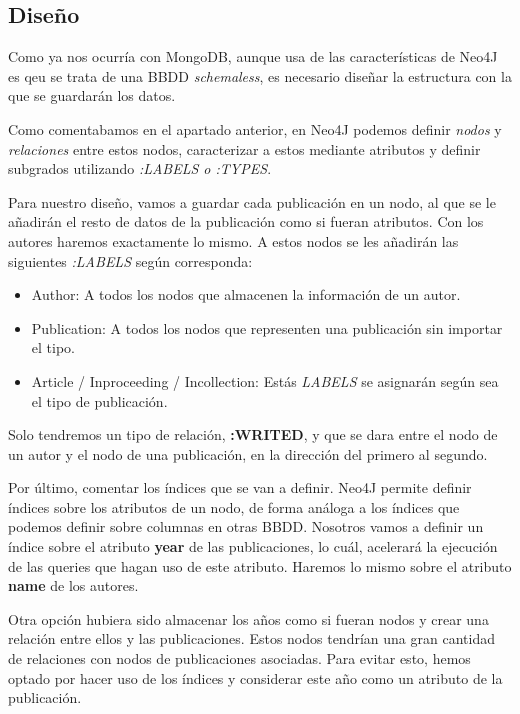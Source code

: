 \subsection{Diseño}

Como ya nos ocurría con MongoDB, aunque usa de las características de Neo4J es qeu se trata de una \gls{BBDD} \textit{schemaless}, es necesario diseñar la estructura con la que se guardarán los datos. 

Como comentabamos en el apartado anterior, en Neo4J podemos definir \textit{nodos} y \textit{relaciones} entre estos nodos, caracterizar a estos mediante atributos y definir subgrados utilizando \textit{:LABELS o :TYPES}. 

Para nuestro diseño, vamos a guardar cada publicación en un nodo, al que se le añadirán el resto de datos de la publicación como si fueran atributos. Con los autores haremos exactamente lo mismo. A estos nodos se les añadirán las siguientes \textit{:LABELS} según corresponda:

\begin{itemize}
 \item Author: A todos los nodos que almacenen la información de un autor.
 \item Publication: A todos los nodos que representen una publicación sin importar el tipo.
 \item Article / Inproceeding / Incollection: Estás \textit{LABELS} se asignarán según sea el tipo de publicación. 
\end{itemize}

Solo tendremos un tipo de relación, \textbf{:WRITED}, y que se dara entre el nodo de un autor y el nodo de una publicación, en la dirección del primero al segundo.

Por último, comentar los índices que se van a definir. Neo4J permite definir índices sobre los atributos de un nodo, de forma análoga a los índices que podemos definir sobre columnas en otras \gls{BBDD}. Nosotros vamos a definir un índice sobre el atributo \textbf{year} de las publicaciones, lo cuál, acelerará la ejecución de las queries que hagan uso de este atributo. Haremos lo mismo sobre el atributo \textbf{name} de los autores.

Otra opción hubiera sido almacenar los años como si fueran nodos y crear una relación entre ellos y las publicaciones. Estos nodos tendrían una gran cantidad de relaciones con nodos de publicaciones asociadas. Para evitar esto, hemos optado por hacer uso de los índices y considerar este año como un atributo de la publicación.

